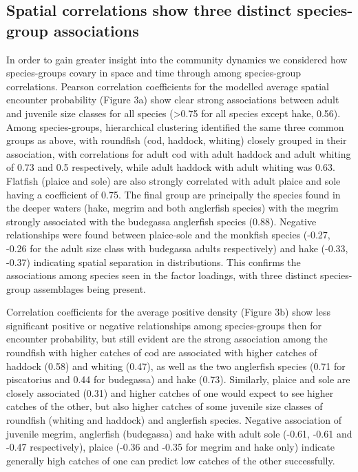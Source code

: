\documentclass{nature}
\begin{document}
\begin{linenumbers}
\subsection{Spatial correlations show three distinct species-group
	associations} In order to gain greater insight into the community
dynamics we considered how species-groups covary in space and time through
among species-group correlations. Pearson correlation coefficients for the
modelled average spatial encounter probability (Figure 3a) show clear strong
associations between adult and juvenile size classes for all species
(\textgreater 0.75 for all species except hake, 0.56).  Among species-groups,
hierarchical clustering identified the same three common groups as above, with
roundfish (cod, haddock, whiting) closely grouped in their association, with
correlations for adult cod with adult haddock and adult whiting of 0.73 and 0.5
respectively, while adult haddock with adult whiting was 0.63. Flatfish (plaice
and sole) are also strongly correlated with adult plaice and sole having a
coefficient of 0.75.  The final group are principally the species found in the
deeper waters (hake, megrim and both anglerfish species) with the megrim
strongly associated with the budegassa anglerfish species (0.88). Negative
relationships were found between plaice-sole and the monkfish species (-0.27,
-0.26 for the adult size class with budegassa adults respectively) and hake
(-0.33, -0.37) indicating spatial separation in distributions. This confirms
the associations among species seen in the factor loadings, with three distinct
species-group assemblages being present.

Correlation coefficients for the average positive density (Figure 3b) show less
significant positive or negative relationships among species-groups then for
encounter probability, but still evident are the strong association among the
roundfish with higher catches of cod are associated with higher catches of
haddock (0.58) and whiting (0.47), as well as the two anglerfish species (0.71
for piscatorius and 0.44 for budegassa) and hake (0.73). Similarly, plaice and
sole are closely associated (0.31) and higher catches of one would expect to
see higher catches of the other, but also higher catches of some juvenile size
classes of roundfish (whiting and haddock) and anglerfish species. Negative
association of juvenile megrim, anglerfish (budegassa) and hake with adult sole
(-0.61, -0.61 and -0.47 respectively), plaice (-0.36 and -0.35 for megrim and
hake only) indicate generally high catches of one can predict low catches of
the other successfully.


\end{linenumbers}
\end{document}
